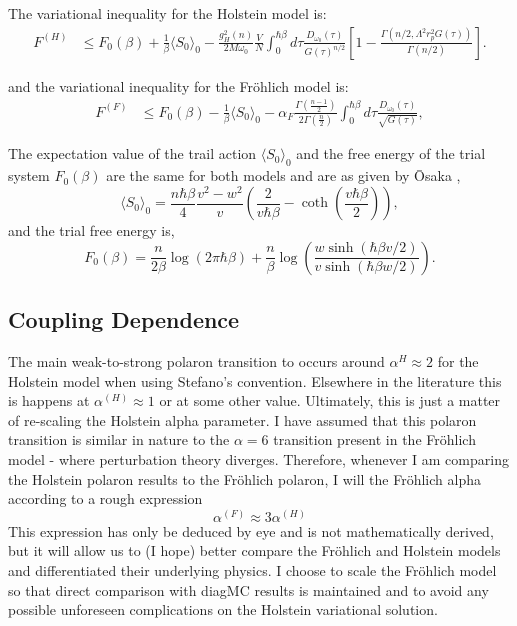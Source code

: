 The variational inequality for the Holstein model is:
\begin{equation}
    \begin{aligned}
        F^{(H)} &\leq F_0(\beta) + \frac{1}{\beta} \langle S_0 \rangle_0 - \frac{g_H^2(n)}{2M\omega_0} \frac{V}{N} \int_0^{\hbar\beta} d\tau \frac{D_{\omega_0}(\tau)}{G(\tau)^{n/2}} \left[1 - \frac{\Gamma(n/2, \Lambda^2 r_p^2 G(\tau))}{\Gamma(n/2)}\right].
    \end{aligned}
\end{equation}

and the variational inequality for the Fr\"ohlich model is:
\begin{equation}
    \begin{aligned}
        F^{(F)} &\leq F_0(\beta) -\frac{1}{\beta} \langle S_0 \rangle_0 - \alpha_F \frac{\Gamma\left(\frac{n-1}{2}\right)}{2 \Gamma(\frac{n}{2})} \int_0^{\hbar\beta} d\tau \frac{D_{\omega_0}(\tau)}{\sqrt{G(\tau)}} ,
    \end{aligned}
\end{equation}

The expectation value of the trail action $\langle S_0 \rangle_0$ and the free energy of the trial system $F_0(\beta) $ are the same for both models and are as given by \=Osaka \cite{Osaka1959},
\begin{equation}
    \langle S_0 \rangle_0 = \frac{n\hbar\beta}{4} \frac{v^2-w^2}{v} \left(\frac{2}{v\hbar\beta} - \coth\left(\frac{v\hbar\beta}{2}\right)\right),
\end{equation}
and the trial free energy is,
\begin{equation}
    F_0(\beta) = \frac{n}{2\beta} \log\left(2\pi\hbar\beta\right) + \frac{n}{\beta} \log\left(\frac{w \sinh(\hbar\beta v / 2)}{v \sinh(\hbar\beta w / 2)}\right).
\end{equation}

\subsection{Coupling Dependence}

The main weak-to-strong polaron transition to occurs around $\alpha^{{H}} \approx 2$ for the Holstein model when using Stefano's convention. Elsewhere in the literature this is happens at $\alpha^{(H)} \approx 1$ or at some other value. Ultimately, this is just a matter of re-scaling the Holstein alpha parameter. I have assumed that this polaron transition is similar in nature to the $\alpha = 6$ transition present in the Fr\"ohlich model - where perturbation theory diverges. Therefore, whenever I am comparing the Holstein polaron results to the Fr\"ohlich polaron, I will  the Fr\"ohlich alpha according to a rough expression
\begin{equation}
    \alpha^{(F)} \approx 3 \alpha^{(H)}
\end{equation}
This expression has only be deduced by eye and is not mathematically derived, but it will allow us to (I hope) better compare the Fr\"ohlich and Holstein models and differentiated their underlying physics. I choose to scale the Fr\"ohlich model so that direct comparison with diagMC results is maintained and to avoid any possible unforeseen complications on the Holstein variational solution.

